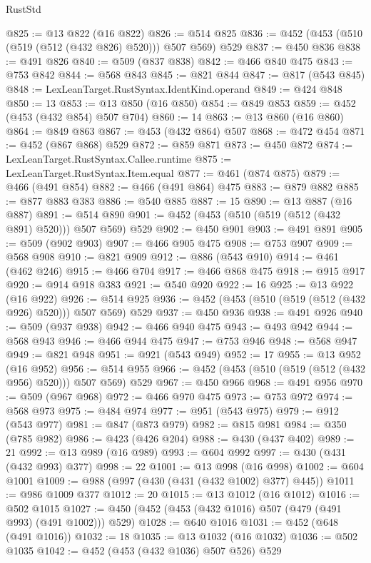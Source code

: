 \begin{lexlean}{RustStd}
\begin{coremodule}
{\begin{coremodule}
{{{{{{{{{{{{@825 := @13 @822 (@16 @822)
@826 := @514 @825
@836 := @452 (@453 (@510 (@519 (@512 (@432 @826) @520))) @507 @569) @529
@837 := @450 @836
@838 := @491 @826
@840 := @509 (@837 @838)
@842 := @466 @840 @475
@843 := @753 @842
@844 := @568 @843
@845 := @821 @844
@847 := @817 (@543 @845)
@848 := LexLeanTarget.RustSyntax.IdentKind.operand
@849 := @424 @848
@850 := 13
@853 := @13 @850 (@16 @850)
@854 := @849 @853
@859 := @452 (@453 (@432 @854) @507 @704)
@860 := 14
@863 := @13 @860 (@16 @860)
@864 := @849 @863
@867 := @453 (@432 @864) @507
@868 := @472 @454
@871 := @452 (@867 @868) @529
@872 := @859 @871
@873 := @450 @872
@874 := LexLeanTarget.RustSyntax.Callee.runtime
@875 := LexLeanTarget.RustSyntax.Item.equal
@877 := @461 (@874 @875)
@879 := @466 (@491 @854)
@882 := @466 (@491 @864) @475
@883 := @879 @882
@885 := @877 @883 @383
@886 := @540 @885
@887 := 15
@890 := @13 @887 (@16 @887)
@891 := @514 @890
@901 := @452 (@453 (@510 (@519 (@512 (@432 @891) @520))) @507 @569) @529
@902 := @450 @901
@903 := @491 @891
@905 := @509 (@902 @903)
@907 := @466 @905 @475
@908 := @753 @907
@909 := @568 @908
@910 := @821 @909
@912 := @886 (@543 @910)
@914 := @461 (@462 @246)
@915 := @466 @704
@917 := @466 @868 @475
@918 := @915 @917
@920 := @914 @918 @383
@921 := @540 @920
@922 := 16
@925 := @13 @922 (@16 @922)
@926 := @514 @925
@936 := @452 (@453 (@510 (@519 (@512 (@432 @926) @520))) @507 @569) @529
@937 := @450 @936
@938 := @491 @926
@940 := @509 (@937 @938)
@942 := @466 @940 @475
@943 := @493 @942
@944 := @568 @943
@946 := @466 @944 @475
@947 := @753 @946
@948 := @568 @947
@949 := @821 @948
@951 := @921 (@543 @949)
@952 := 17
@955 := @13 @952 (@16 @952)
@956 := @514 @955
@966 := @452 (@453 (@510 (@519 (@512 (@432 @956) @520))) @507 @569) @529
@967 := @450 @966
@968 := @491 @956
@970 := @509 (@967 @968)
@972 := @466 @970 @475
@973 := @753 @972
@974 := @568 @973
@975 := @484 @974
@977 := @951 (@543 @975)
@979 := @912 (@543 @977)
@981 := @847 (@873 @979)
@982 := @815 @981
@984 := @350 (@785 @982)
@986 := @423 (@426 @204)
@988 := @430 (@437 @402)
@989 := 21
@992 := @13 @989 (@16 @989)
@993 := @604 @992
@997 := @430 (@431 (@432 @993) @377)
@998 := 22
@1001 := @13 @998 (@16 @998)
@1002 := @604 @1001
@1009 := @988 (@997 (@430 (@431 (@432 @1002) @377) @445))
@1011 := @986 @1009 @377
@1012 := 20
@1015 := @13 @1012 (@16 @1012)
@1016 := @502 @1015
@1027 := @450 (@452 (@453 (@432 @1016) @507 (@479 (@491 @993) (@491 @1002))) @529)
@1028 := @640 @1016
@1031 := @452 (@648 (@491 @1016))
@1032 := 18
@1035 := @13 @1032 (@16 @1032)
@1036 := @502 @1035
@1042 := @452 (@453 (@432 @1036) @507 @526) @529
}}}}}}}}}}}}
\end{coremodule}}
\end{coremodule}
\end{lexlean}
